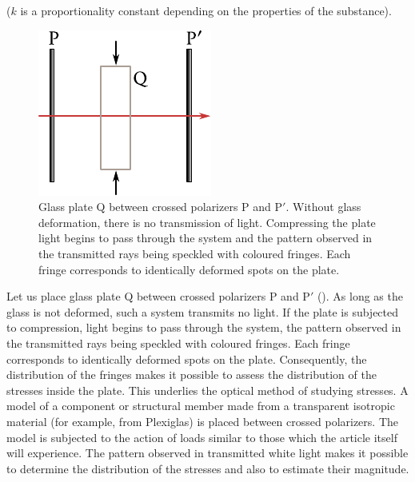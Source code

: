 \noindent
($k$ is a proportionality constant depending on the properties of the substance).

\begin{figure}[t]
	\begin{center}
		\includegraphics[scale=1]{figures/ch_19/fig_19_19.pdf}
		\caption[]{Glass plate Q between crossed polarizers P and P$'$. Without glass deformation, there is no transmission of light. Compressing the plate light begins to pass through the system and the pattern observed in the transmitted rays being speckled with coloured fringes. Each fringe corresponds to identically deformed spots on the plate.}
		\label{fig:19_19}
	\end{center}
	\vspace{-0.8cm}
\end{figure}

Let us place glass plate Q between crossed polarizers P and P$'$ ().
As long as the glass is not deformed, such a system transmits no light.
If the plate is subjected to compression, light begins to pass through the system, the pattern observed in the transmitted rays being speckled with coloured fringes.
Each fringe corresponds to identically deformed spots on the plate.
Consequently, the distribution of the fringes makes it possible to assess the distribution of the stresses inside the plate.
This underlies the optical method of studying stresses.
A model of a component or structural member made from a transparent isotropic material (for example, from Plexiglas) is placed between crossed polarizers.
The model is subjected to the action of loads similar to those which the article itself will
experience.
The pattern observed in transmitted white light makes it possible to determine the distribution of the stresses and also to estimate their magnitude.

